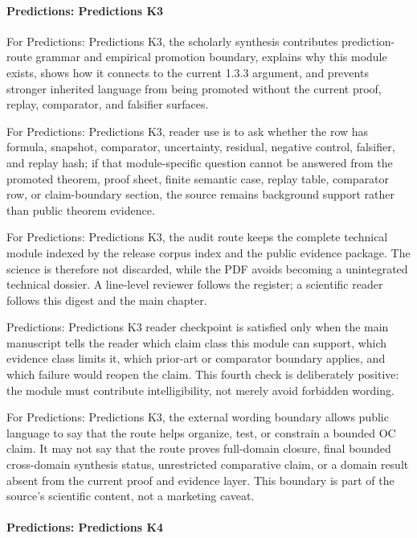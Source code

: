 \paragraph{Predictions: Predictions K3}

For Predictions: Predictions K3, the scholarly synthesis contributes prediction-route grammar and empirical promotion boundary, explains why this module exists, shows how it connects to the current 1.3.3 argument, and prevents stronger inherited language from being promoted without the current proof, replay, comparator, and falsifier surfaces.


For Predictions: Predictions K3, reader use is to ask whether the row has formula, snapshot, comparator, uncertainty, residual, negative control, falsifier, and replay hash; if that module-specific question cannot be answered from the promoted theorem, proof sheet, finite semantic case, replay table, comparator row, or claim-boundary section, the source remains background support rather than public theorem evidence.


For Predictions: Predictions K3, the audit route keeps the complete technical module indexed by the release corpus index and the public evidence package. The science is therefore not discarded, while the PDF avoids becoming a unintegrated technical dossier. A line-level reviewer follows the register; a scientific reader follows this digest and the main chapter.


Predictions: Predictions K3 reader checkpoint is satisfied only when the main manuscript tells the reader which claim class this module can support, which evidence class limits it, which prior-art or comparator boundary applies, and which failure would reopen the claim. This fourth check is deliberately positive: the module must contribute intelligibility, not merely avoid forbidden wording.


For Predictions: Predictions K3, the external wording boundary allows public language to say that the route helps organize, test, or constrain a bounded OC claim. It may not say that the route proves full-domain closure, final bounded cross-domain synthesis status, unrestricted comparative claim, or a domain result absent from the current proof and evidence layer. This boundary is part of the source's scientific content, not a marketing caveat.


\paragraph{Predictions: Predictions K4}

